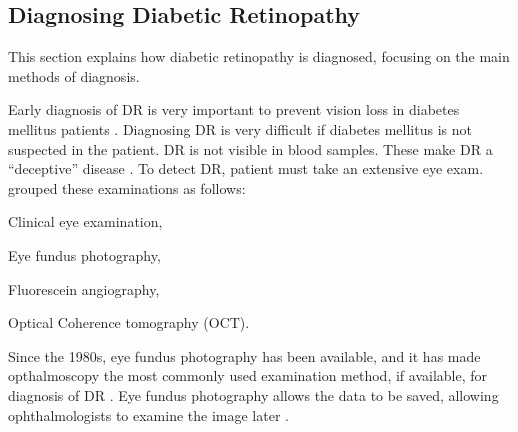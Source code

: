 \subsection{Diagnosing Diabetic Retinopathy}

This section explains how diabetic retinopathy is diagnosed, focusing on the main methods of diagnosis.

Early diagnosis of DR is very important to prevent vision loss in diabetes mellitus patients \citep{mankarautomatic}. Diagnosing DR is very difficult if diabetes mellitus is not suspected in the patient. DR is not visible in blood samples. These make DR a ``deceptive'' disease \citep{kauppi2010eye}. To detect DR, patient must take an extensive eye exam. \citet{kauppi2010eye} grouped these examinations as follows:
\begin{compactitem}
    \item Clinical eye examination,
    \item Eye fundus photography,
    \item Fluorescein angiography,
    \item Optical Coherence tomography (OCT).
\end{compactitem}
Since the 1980s, eye fundus photography has been available, and it has made opthalmoscopy the most commonly used examination method, if available, for diagnosis of DR \citep{wendt2005screening}. Eye fundus photography allows the data to be saved, allowing ophthalmologists to examine the image later \citep{hutchinson2000effectiveness}. 

